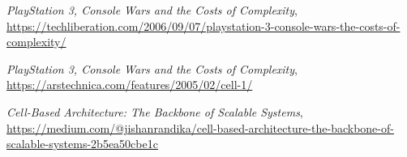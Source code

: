 \documentclass[10pt,compsoc]{IEEEtran}
\begin{document}
\begin{thebibliography}{1}
			{\it{PlayStation 3, Console Wars and the Costs of Complexity}},		
			\url{https://techliberation.com/2006/09/07/playstation-3-console-wars-the-costs-of-complexity/}\newline
			
			
			{\it{PlayStation 3, Console Wars and the Costs of Complexity}}, 			
			\url{https://arstechnica.com/features/2005/02/cell-1/}\newline
			
			{\it{Cell-Based Architecture: The Backbone of Scalable Systems}}, 			
			\url{https://medium.com/@jishanrandika/cell-based-architecture-the-backbone-of-scalable-systems-2b5ea50cbe1c}
			
		
		\end{thebibliography}
		
			
	
		
\end{document}
